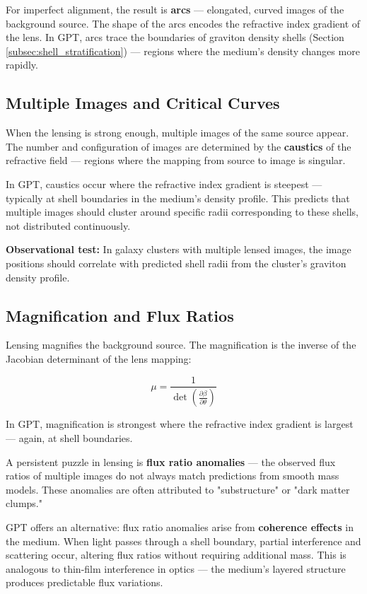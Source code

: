 \documentclass[12pt, a4paper]{article}
\begin{document}
For imperfect alignment, the result is \textbf{arcs} — elongated, curved images of the background source. The shape of the arcs encodes the refractive index gradient of the lens. In GPT, arcs trace the boundaries of graviton density shells (Section \ref{subsec:shell_stratification}) — regions where the medium's density changes more rapidly.

\subsection{Multiple Images and Critical Curves}
\label{subsec:multiple_images}

When the lensing is strong enough, multiple images of the same source appear. The number and configuration of images are determined by the \textbf{caustics} of the refractive field — regions where the mapping from source to image is singular.

In GPT, caustics occur where the refractive index gradient is steepest — typically at shell boundaries in the medium's density profile. This predicts that multiple images should cluster around specific radii corresponding to these shells, not distributed continuously.

\textbf{Observational test:} In galaxy clusters with multiple lensed images, the image positions should correlate with predicted shell radii from the cluster's graviton density profile.

\subsection{Magnification and Flux Ratios}
\label{subsec:magnification}

Lensing magnifies the background source. The magnification is the inverse of the Jacobian determinant of the lens mapping:

\[
\mu = \frac{1}{\det \left( \frac{\partial \beta}{\partial \theta} \right)}
\]

In GPT, magnification is strongest where the refractive index gradient is largest — again, at shell boundaries.

A persistent puzzle in lensing is \textbf{flux ratio anomalies} — the observed flux ratios of multiple images do not always match predictions from smooth mass models. These anomalies are often attributed to "substructure" or "dark matter clumps."

GPT offers an alternative: flux ratio anomalies arise from \textbf{coherence effects} in the medium. When light passes through a shell boundary, partial interference and scattering occur, altering flux ratios without requiring additional mass. This is analogous to thin-film interference in optics — the medium's layered structure produces predictable flux variations.
\end{document}
